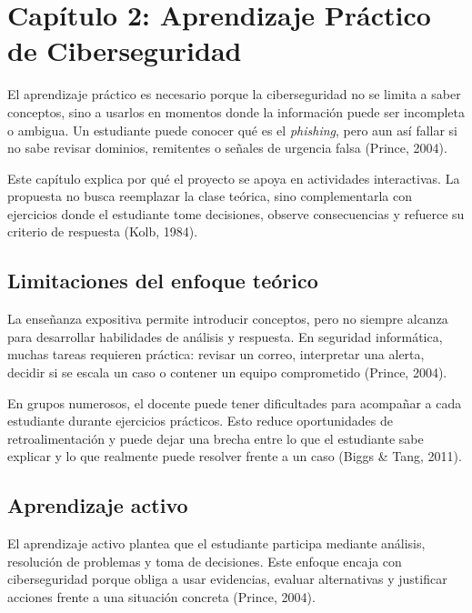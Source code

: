 \section[Cap\'{i}tulo 2: Aprendizaje Pr\'{a}ctico de Ciberseguridad]{\centering Cap\'{i}tulo 2: Aprendizaje Pr\'{a}ctico de Ciberseguridad}

El aprendizaje pr\'{a}ctico es necesario porque la ciberseguridad no se limita a saber conceptos, sino a usarlos en momentos donde la informaci\'{o}n puede ser incompleta o ambigua. Un estudiante puede conocer qu\'{e} es el \textit{phishing}, pero aun as\'{i} fallar si no sabe revisar dominios, remitentes o se\~{n}ales de urgencia falsa (Prince, 2004).

Este cap\'{i}tulo explica por qu\'{e} el proyecto se apoya en actividades interactivas. La propuesta no busca reemplazar la clase te\'{o}rica, sino complementarla con ejercicios donde el estudiante tome decisiones, observe consecuencias y refuerce su criterio de respuesta (Kolb, 1984).

\subsection{Limitaciones del enfoque te\'{o}rico}

La ense\~{n}anza expositiva permite introducir conceptos, pero no siempre alcanza para desarrollar habilidades de an\'{a}lisis y respuesta. En seguridad inform\'{a}tica, muchas tareas requieren pr\'{a}ctica: revisar un correo, interpretar una alerta, decidir si se escala un caso o contener un equipo comprometido (Prince, 2004).

En grupos numerosos, el docente puede tener dificultades para acompa\~{n}ar a cada estudiante durante ejercicios pr\'{a}cticos. Esto reduce oportunidades de retroalimentaci\'{o}n y puede dejar una brecha entre lo que el estudiante sabe explicar y lo que realmente puede resolver frente a un caso (Biggs \& Tang, 2011).

\subsection{Aprendizaje activo}

El aprendizaje activo plantea que el estudiante participa mediante an\'{a}lisis, resoluci\'{o}n de problemas y toma de decisiones. Este enfoque encaja con ciberseguridad porque obliga a usar evidencias, evaluar alternativas y justificar acciones frente a una situaci\'{o}n concreta (Prince, 2004).

